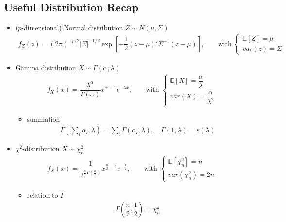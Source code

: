 \subsection{Useful Distribution Recap}
\begin{itemize}[topsep=2pt,itemsep=0pt]
    \item ($ p $-dimensional) Normal distribution $ Z\sim N(\mu ,\Sigma ) $
    \begin{align*}
        f_Z(z)=(2\pi)^{-p/2}|\Sigma |^{-1/2} \exp\left[ -\dfrac{1}{2}(z-\mu )'\Sigma ^{-1}(z-\mu ) \right],\qquad \text{with }\begin{cases}
            \mathbb{E}\left[ Z \right]=\mu\\
            var(z)=\Sigma  
        \end{cases} 
    \end{align*}   
    
    
    
    \item Gamma distribution $ X\sim \Gamma (\alpha ,\lambda ) $
    \begin{align*}
         f_X(x)=\dfrac{\lambda ^\alpha }{\Gamma (\alpha )}x^{\alpha -1}e^{-\lambda x},\qquad \text{with }  \begin{cases}
            \mathbb{E}\left[ X \right] =\dfrac{\alpha }{\lambda }\\
            var(X)=\dfrac{\alpha }{\lambda ^2} 
         \end{cases}  
    \end{align*}

    \begin{itemize}[topsep=2pt,itemsep=0pt]
        \item summation
        \begin{align*}
            \Gamma (\sum_{i}\alpha _i ,\lambda )=\sum_{i} \Gamma (\alpha _i,\lambda ),\quad \Gamma (1,\lambda )=\varepsilon (\lambda ) 
        \end{align*}
        
    \end{itemize}
    \item $ \chi^2 $-distribution $ X\sim \chi^2_n $
        \begin{align*}
            f_X(x)=\dfrac{1}{2^{\frac{n}{2}\Gamma (\frac{n}{2})}}x^{\frac{n}{2}-1}e^{-\frac{x}{2}} ,\qquad \text{with }  \begin{cases}
                \mathbb{E}\left[ \chi^2_n \right] =n\\
                 var(\chi^2_n)=2n 
            \end{cases}
        \end{align*}
        \begin{itemize}[topsep=2pt,itemsep=0pt]
            \item relation to $ \Gamma  $
        \begin{align*}
            \Gamma (\dfrac{n}{2},\dfrac{1}{2})=\chi^2_n 
        \end{align*}
        \end{itemize}
        

\end{itemize}
